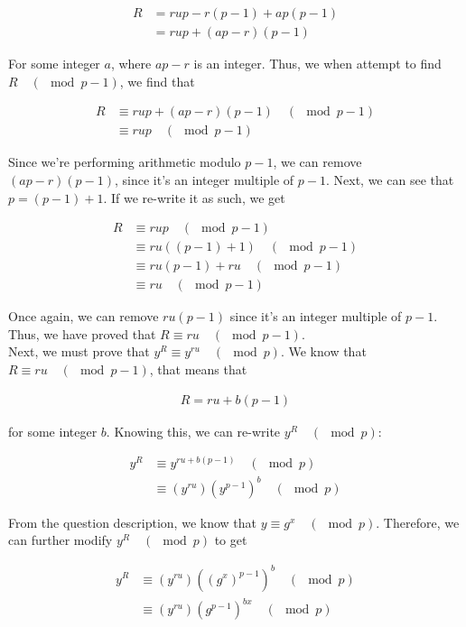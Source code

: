 \documentclass[11pt]{article}
\theoremstyle{definition}
\begin{document}
\begin{enumerate}
\begin{enumerate}
\begin{align*}
    R &= rup - r(p - 1) + ap(p-1) \\
    &= rup + (ap - r)(p-1)
\end{align*}

For some integer $a$, where $ap - r$ is an integer. Thus, we when attempt to find $R \quad (\mod{p-1})$, we find that

\begin{align*}
    R &\equiv rup + (ap - r)(p - 1) \quad (\mod{p - 1}) \\
    &\equiv rup \quad (\mod{p - 1})
\end{align*}

Since we're performing arithmetic modulo $p - 1$, we can remove $(ap - r)(p - 1)$, since it's an integer multiple of $p - 1$. Next, we can see that $p = (p - 1) + 1$. If we re-write it as such, we get

\begin{align*}
    R &\equiv rup \quad (\mod{p - 1}) \\
    &\equiv ru((p - 1) + 1) \quad (\mod{p - 1}) \\
    &\equiv ru(p - 1) + ru \quad (\mod{p - 1}) \\
    &\equiv ru \quad (\mod{p - 1})
\end{align*}

Once again, we can remove $ru(p - 1)$ since it's an integer multiple of $p - 1$. Thus, we have proved that $R \equiv ru \quad (\mod{p - 1})$. \\

Next, we must prove that $y^R \equiv y^{ru} \quad (\mod{p})$. We know that $R \equiv ru \quad (\mod{p - 1})$, that means that

\begin{align*}
    R = ru + b(p - 1)
\end{align*}

for some integer $b$. Knowing this, we can re-write $y^R \quad (\mod{p})$:

\begin{align*}
    y^R &\equiv y^{ru + b(p - 1)} \quad (\mod{p}) \\
    &\equiv (y^{ru}) (y^{p - 1})^b \quad (\mod{p})
\end{align*}

From the question description, we know that $y \equiv g^x \quad (\mod{p})$. Therefore, we can further modify $y^R \quad (\mod{p})$ to get

\begin{align*}
    y^R &\equiv (y^{ru}) ((g^x)^{p - 1})^b \quad (\mod{p}) \\
    &\equiv (y^{ru}) (g^{p - 1})^{bx} \quad (\mod{p})
\end{align*}


\end{enumerate}
\end{enumerate}
\end{document}
